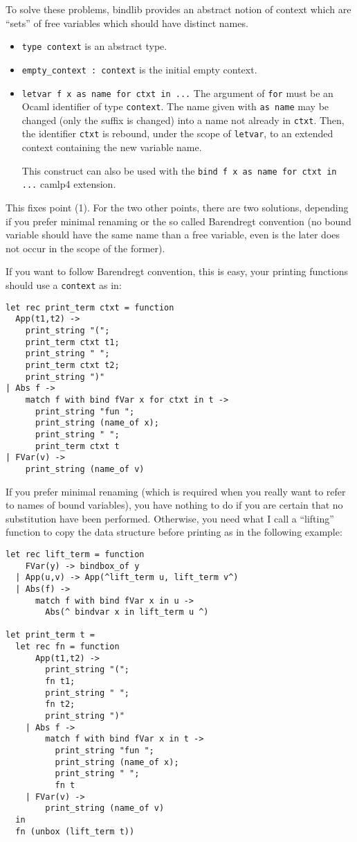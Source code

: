 \documentclass[11pt]{article}
\begin{document}
To solve these problems, bindlib provides an abstract notion of context
 which are ``sets'' of free variables which should have
 distinct names.
\begin{itemize}
\item\verb#type context# is  an abstract type.
\item\verb#empty_context : context# is the initial empty context.
\item\verb#letvar f x as name for ctxt in ...# The argument of \verb#for# must be an Ocaml
identifier of type \verb#context#. The name given with \verb#as name#
may be changed (only the suffix is changed) into a name not already in
\verb#ctxt#. Then, the identifier  \verb#ctxt# is rebound, under the
scope of \verb#letvar#, to an extended context containing the new variable name.

This construct can also
be used with the \verb#bind f x as name for ctxt in ...# camlp4 extension.
\end{itemize}

This fixes point (1). For the two other points, there are two solutions,
depending if you prefer minimal renaming or the so called Barendregt
convention (no bound variable should have the same name than a free
variable, even is the later does not occur in the scope of the
former).

If you want to follow Barendregt convention, this is easy, your
printing functions should use a \verb#context# as in:

\begin{verbatim}
let rec print_term ctxt = function
  App(t1,t2) ->
    print_string "(";
    print_term ctxt t1;
    print_string " ";
    print_term ctxt t2;
    print_string ")"
| Abs f ->
    match f with bind fVar x for ctxt in t ->
      print_string "fun ";
      print_string (name_of x);
      print_string " ";
      print_term ctxt t
| FVar(v) ->
    print_string (name_of v)
\end{verbatim}

If you prefer minimal renaming (which is required when you really want
to refer to names of bound variables), you have nothing to do if you are
certain that no substitution have been performed. Otherwise, you need
what I call a ``lifting'' function to copy the data structure before
printing as in the following example:

\begin{verbatim}
let rec lift_term = function
    FVar(y) -> bindbox_of y
  | App(u,v) -> App(^lift_term u, lift_term v^)
  | Abs(f) ->
      match f with bind fVar x in u ->
        Abs(^ bindvar x in lift_term u ^)

let print_term t =
  let rec fn = function
      App(t1,t2) ->
        print_string "(";
        fn t1;
        print_string " ";
        fn t2;
        print_string ")"
    | Abs f ->
        match f with bind fVar x in t ->
          print_string "fun ";
          print_string (name_of x);
          print_string " ";
          fn t
    | FVar(v) ->
        print_string (name_of v)
  in
  fn (unbox (lift_term t))
\end{verbatim}
\end{document}
